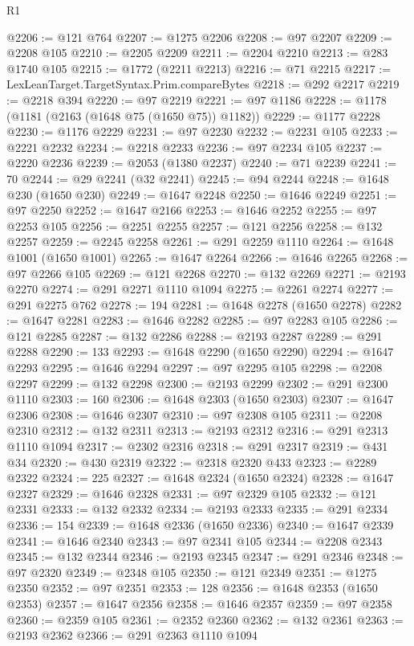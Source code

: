 \begin{lexlean}{R1}
\begin{coremodule}
{{{{{{{{{{{{{{{{{{{{{{{{{{{{{{{{{{{{{{{{{{{{{{{{{{{{{{{{{{{{{{{{{{{{{{{{{{{{{{{{{{{{{{{{{{{{{{{{{{{{{{{{{{{{{{{{{{{{{{{{{{{{{{{{{{{{{{{{{{{{{{{{{{{{{{{{{{{{{{{{{{{{{{{{{{{{{{{{{{{{{{{{{{@2206 := @121 @764
@2207 := @1275 @2206
@2208 := @97 @2207
@2209 := @2208 @105
@2210 := @2205 @2209
@2211 := @2204 @2210
@2213 := @283 @1740 @105
@2215 := @1772 (@2211 @2213)
@2216 := @71 @2215
@2217 := LexLeanTarget.TargetSyntax.Prim.compareBytes
@2218 := @292 @2217
@2219 := @2218 @394
@2220 := @97 @2219
@2221 := @97 @1186
@2228 := @1178 (@1181 (@2163 (@1648 @75 (@1650 @75)) @1182))
@2229 := @1177 @2228
@2230 := @1176 @2229
@2231 := @97 @2230
@2232 := @2231 @105
@2233 := @2221 @2232
@2234 := @2218 @2233
@2236 := @97 @2234 @105
@2237 := @2220 @2236
@2239 := @2053 (@1380 @2237)
@2240 := @71 @2239
@2241 := 70
@2244 := @29 @2241 (@32 @2241)
@2245 := @94 @2244
@2248 := @1648 @230 (@1650 @230)
@2249 := @1647 @2248
@2250 := @1646 @2249
@2251 := @97 @2250
@2252 := @1647 @2166
@2253 := @1646 @2252
@2255 := @97 @2253 @105
@2256 := @2251 @2255
@2257 := @121 @2256
@2258 := @132 @2257
@2259 := @2245 @2258
@2261 := @291 @2259 @1110
@2264 := @1648 @1001 (@1650 @1001)
@2265 := @1647 @2264
@2266 := @1646 @2265
@2268 := @97 @2266 @105
@2269 := @121 @2268
@2270 := @132 @2269
@2271 := @2193 @2270
@2274 := @291 @2271 @1110 @1094
@2275 := @2261 @2274
@2277 := @291 @2275 @762
@2278 := 194
@2281 := @1648 @2278 (@1650 @2278)
@2282 := @1647 @2281
@2283 := @1646 @2282
@2285 := @97 @2283 @105
@2286 := @121 @2285
@2287 := @132 @2286
@2288 := @2193 @2287
@2289 := @291 @2288
@2290 := 133
@2293 := @1648 @2290 (@1650 @2290)
@2294 := @1647 @2293
@2295 := @1646 @2294
@2297 := @97 @2295 @105
@2298 := @2208 @2297
@2299 := @132 @2298
@2300 := @2193 @2299
@2302 := @291 @2300 @1110
@2303 := 160
@2306 := @1648 @2303 (@1650 @2303)
@2307 := @1647 @2306
@2308 := @1646 @2307
@2310 := @97 @2308 @105
@2311 := @2208 @2310
@2312 := @132 @2311
@2313 := @2193 @2312
@2316 := @291 @2313 @1110 @1094
@2317 := @2302 @2316
@2318 := @291 @2317
@2319 := @431 @34
@2320 := @430 @2319
@2322 := @2318 @2320 @433
@2323 := @2289 @2322
@2324 := 225
@2327 := @1648 @2324 (@1650 @2324)
@2328 := @1647 @2327
@2329 := @1646 @2328
@2331 := @97 @2329 @105
@2332 := @121 @2331
@2333 := @132 @2332
@2334 := @2193 @2333
@2335 := @291 @2334
@2336 := 154
@2339 := @1648 @2336 (@1650 @2336)
@2340 := @1647 @2339
@2341 := @1646 @2340
@2343 := @97 @2341 @105
@2344 := @2208 @2343
@2345 := @132 @2344
@2346 := @2193 @2345
@2347 := @291 @2346
@2348 := @97 @2320
@2349 := @2348 @105
@2350 := @121 @2349
@2351 := @1275 @2350
@2352 := @97 @2351
@2353 := 128
@2356 := @1648 @2353 (@1650 @2353)
@2357 := @1647 @2356
@2358 := @1646 @2357
@2359 := @97 @2358
@2360 := @2359 @105
@2361 := @2352 @2360
@2362 := @132 @2361
@2363 := @2193 @2362
@2366 := @291 @2363 @1110 @1094
}}}}}}}}}}}}}}}}}}}}}}}}}}}}}}}}}}}}}}}}}}}}}}}}}}}}}}}}}}}}}}}}}}}}}}}}}}}}}}}}}}}}}}}}}}}}}}}}}}}}}}}}}}}}}}}}}}}}}}}}}}}}}}}}}}}}}}}}}}}}}}}}}}}}}}}}}}}}}}}}}}}}}}}}}}}}}}}}}}}}}}}}}}
\end{coremodule}
\end{lexlean}
